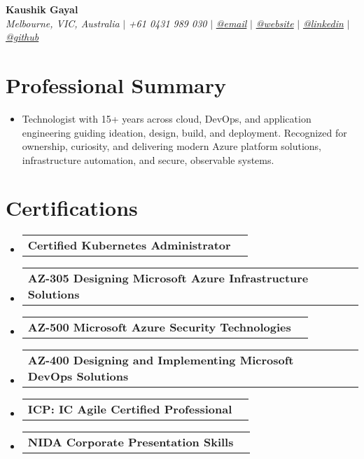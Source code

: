 \documentclass[letterpaper,10pt]{article}
\makeatletter
\newcommand{\sectionspace}{\vspace{-20pt}}
\newcommand{\subheadingtitlevspace}{\vspace{-3pt}}
\newcommand{\titleItem}[1]{\textbf{#1}}
\newcommand{\resumeProjectHeading}[2]{\item\begin{tabular*}{0.97\textwidth}{l@{\extracolsep{\fill}}r}#1 & \textit{ #2} \\\end{tabular*}\vspace{-9pt}}
\newcommand{\resumeSubHeadingListStart}{\subheadingtitlevspace\begin{itemize}[leftmargin=0.15in, label={}]}
\newcommand{\resumeSubHeadingListEnd}{\end{itemize}}
\makeatother
\begin{document}
\begin{flushleft}
    \textbf{\large Kaushik Gayal} \\
    \textit{Melbourne, VIC, Australia} $|$ 
    \textit{+61 0431 989 030} $|$  
    \href{mailto:gayal.kaushik@gmail.com}{\textit{@email}} $|$
    \href{ https://kaushik.gayal.dev }{\textit{@website}} $|$
    \href{ https://www.linkedin.com/in/kaushik-gayal-02a57316/ }{\textit{@linkedin}} $|$
    \href{ https://github.com/koshikg }{\textit{@github}}
    \vspace{-8pt}
\end{flushleft}

\section{Professional Summary}
\vspace{-3pt}
\begin{itemize}[leftmargin=0.15in, label={}]
    \item{Technologist with 15+ years across cloud, DevOps, and application engineering guiding ideation, design, build, and deployment. Recognized for ownership, curiosity, and delivering modern Azure platform solutions, infrastructure automation, and secure, observable systems.}
\end{itemize}
\sectionspace

\section{Certifications}
\resumeSubHeadingListStart
\resumeProjectHeading{\titleItem{Certified Kubernetes Administrator}}{}
\resumeProjectHeading{\titleItem{AZ-305 Designing Microsoft Azure Infrastructure Solutions}}{}
\resumeProjectHeading{\titleItem{AZ-500 Microsoft Azure Security Technologies}}{}
\resumeProjectHeading{\titleItem{AZ-400 Designing and Implementing Microsoft DevOps Solutions}}{}
\resumeProjectHeading{\titleItem{ICP: IC Agile Certified Professional}}{}
\resumeProjectHeading{\titleItem{NIDA Corporate Presentation Skills}}{}
\resumeSubHeadingListEnd

\end{document}
